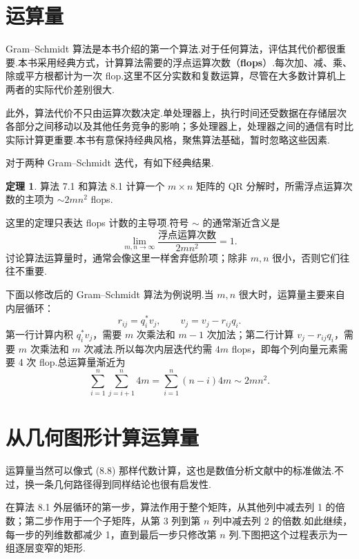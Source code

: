 \documentclass[UTF8,fontset=none,12pt]{ctexart}
\theoremstyle{definition}
\newtheorem{theorem}{定理}
\begin{document}
\section*{运算量}

Gram--Schmidt 算法是本书介绍的第一个算法.对于任何算法，评估其代价都很重要.本书采用经典方式，计算算法需要的浮点运算次数（\textbf{flops}）.每次加、减、乘、除或平方根都计为一次 flop.这里不区分实数和复数运算，尽管在大多数计算机上两者的实际代价差别很大.

此外，算法代价不只由运算次数决定.单处理器上，执行时间还受数据在存储层次各部分之间移动以及其他任务竞争的影响；多处理器上，处理器之间的通信有时比实际计算更重要.本书有意保持经典风格，聚焦算法基础，暂时忽略这些因素.

对于两种 Gram--Schmidt 迭代，有如下经典结果.

\begin{theorem}
算法 7.1 和算法 8.1 计算一个 $m\times n$ 矩阵的 QR 分解时，所需浮点运算次数的主项为 $\sim 2mn^2$ flops.
\end{theorem}

这里的定理只表达 flops 计数的主导项.符号 $\sim$ 的通常渐近含义是
\[
    \lim_{m,n\to\infty}
    \frac{\text{浮点运算次数}}{2mn^2}=1.
\]
讨论算法运算量时，通常会像这里一样舍弃低阶项；除非 $m,n$ 很小，否则它们往往不重要.

下面以修改后的 Gram--Schmidt 算法为例说明.当 $m,n$ 很大时，运算量主要来自内层循环：
\[
    r_{ij}=q_i^*v_j,\qquad v_j=v_j-r_{ij}q_i.
\]
第一行计算内积 $q_i^*v_j$，需要 $m$ 次乘法和 $m-1$ 次加法；第二行计算 $v_j-r_{ij}q_i$，需要 $m$ 次乘法和 $m$ 次减法.所以每次内层迭代约需 $4m$ flops，即每个列向量元素需要 4 次 flop.总运算量渐近为
\begin{equation}
    \sum_{i=1}^{n}\sum_{j=i+1}^{n}4m
    =\sum_{i=1}^{n}(n-i)4m
    \sim 2mn^2.
    \tag{8.8}
\end{equation}

\section*{从几何图形计算运算量}

运算量当然可以像式 (8.8) 那样代数计算，这也是数值分析文献中的标准做法.不过，换一条几何路径得到同样结论也很有启发性.

在算法 8.1 外层循环的第一步，算法作用于整个矩阵，从其他列中减去列 1 的倍数；第二步作用于一个子矩阵，从第 3 列到第 $n$ 列中减去列 2 的倍数.如此继续，每一步的列维数都减少 1，直到最后一步只修改第 $n$ 列.下图把这个过程表示为一组逐层变窄的矩形.
\end{document}

